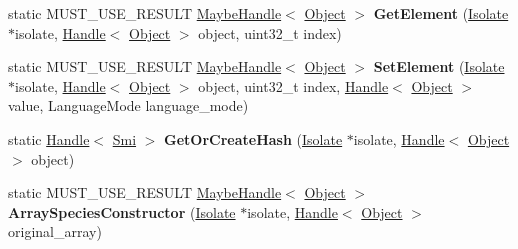 \begin{DoxyCompactItemize}
\item 
static M\+U\+S\+T\+\_\+\+U\+S\+E\+\_\+\+R\+E\+S\+U\+LT \hyperlink{classv8_1_1internal_1_1_maybe_handle}{Maybe\+Handle}$<$ \hyperlink{classv8_1_1internal_1_1_object}{Object} $>$ {\bfseries Get\+Element} (\hyperlink{classv8_1_1internal_1_1_isolate}{Isolate} $\ast$isolate, \hyperlink{classv8_1_1internal_1_1_handle}{Handle}$<$ \hyperlink{classv8_1_1internal_1_1_object}{Object} $>$ object, uint32\+\_\+t index)\hypertarget{classv8_1_1internal_1_1_object_a38d82e0f9c0c94096d6524b34844dc1a}{}\label{classv8_1_1internal_1_1_object_a38d82e0f9c0c94096d6524b34844dc1a}

\item 
static M\+U\+S\+T\+\_\+\+U\+S\+E\+\_\+\+R\+E\+S\+U\+LT \hyperlink{classv8_1_1internal_1_1_maybe_handle}{Maybe\+Handle}$<$ \hyperlink{classv8_1_1internal_1_1_object}{Object} $>$ {\bfseries Set\+Element} (\hyperlink{classv8_1_1internal_1_1_isolate}{Isolate} $\ast$isolate, \hyperlink{classv8_1_1internal_1_1_handle}{Handle}$<$ \hyperlink{classv8_1_1internal_1_1_object}{Object} $>$ object, uint32\+\_\+t index, \hyperlink{classv8_1_1internal_1_1_handle}{Handle}$<$ \hyperlink{classv8_1_1internal_1_1_object}{Object} $>$ value, Language\+Mode language\+\_\+mode)\hypertarget{classv8_1_1internal_1_1_object_a23dd55843639ed7fd2aff0a62ce15e39}{}\label{classv8_1_1internal_1_1_object_a23dd55843639ed7fd2aff0a62ce15e39}

\item 
static \hyperlink{classv8_1_1internal_1_1_handle}{Handle}$<$ \hyperlink{classv8_1_1internal_1_1_smi}{Smi} $>$ {\bfseries Get\+Or\+Create\+Hash} (\hyperlink{classv8_1_1internal_1_1_isolate}{Isolate} $\ast$isolate, \hyperlink{classv8_1_1internal_1_1_handle}{Handle}$<$ \hyperlink{classv8_1_1internal_1_1_object}{Object} $>$ object)\hypertarget{classv8_1_1internal_1_1_object_abc115f2af2f366a5b24423b179397cf6}{}\label{classv8_1_1internal_1_1_object_abc115f2af2f366a5b24423b179397cf6}

\item 
static M\+U\+S\+T\+\_\+\+U\+S\+E\+\_\+\+R\+E\+S\+U\+LT \hyperlink{classv8_1_1internal_1_1_maybe_handle}{Maybe\+Handle}$<$ \hyperlink{classv8_1_1internal_1_1_object}{Object} $>$ {\bfseries Array\+Species\+Constructor} (\hyperlink{classv8_1_1internal_1_1_isolate}{Isolate} $\ast$isolate, \hyperlink{classv8_1_1internal_1_1_handle}{Handle}$<$ \hyperlink{classv8_1_1internal_1_1_object}{Object} $>$ original\+\_\+array)\hypertarget{classv8_1_1internal_1_1_object_a1dc48791219cb80d7f31f36fdd5a627c}{}\label{classv8_1_1internal_1_1_object_a1dc48791219cb80d7f31f36fdd5a627c}


\end{DoxyCompactItemize}
